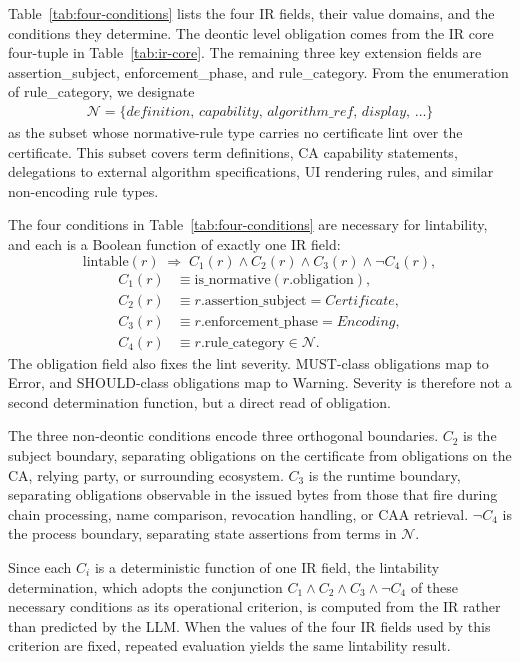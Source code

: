 Table~\ref{tab:four-conditions} lists the four IR fields, their value domains, and the conditions they determine. The deontic level obligation comes from the IR core four-tuple in Table~\ref{tab:ir-core}. The remaining three key extension fields are assertion\_\allowbreak subject, enforcement\_\allowbreak phase, and rule\_\allowbreak category. From the enumeration of rule\_\allowbreak category, we designate
\begin{gather*}
\mathcal{N} = \{definition,\,capability,\,algorithm\_ref,\,display,\,\dots\}
\end{gather*}
as the subset whose normative-rule type carries no certificate lint over the certificate. This subset covers term definitions, CA capability statements, delegations to external algorithm specifications, UI rendering rules, and similar non-encoding rule types.

The four conditions in Table~\ref{tab:four-conditions} are necessary for lintability, and each is a Boolean function of exactly one IR field:
\begin{equation}\label{eq:lintable}
\mathrm{lintable}(r) \;\Longrightarrow\; C_1(r)\wedge C_2(r)\wedge C_3(r)\wedge \neg C_4(r),
\end{equation}
\begin{align*}
C_1(r) &\equiv \mathrm{is\_normative}(r.\text{obligation}), \\
C_2(r) &\equiv r.\text{assertion\_subject} = Certificate, \\
C_3(r) &\equiv r.\text{enforcement\_phase} = Encoding, \\
C_4(r) &\equiv r.\text{rule\_category} \in \mathcal{N}.
\end{align*}
The obligation field also fixes the lint severity. MUST-class obligations map to Error, and SHOULD-class obligations map to Warning. Severity is therefore not a second determination function, but a direct read of obligation.

The three non-deontic conditions encode three orthogonal boundaries. $C_2$ is the subject boundary, separating obligations on the certificate from obligations on the CA, relying party, or surrounding ecosystem. $C_3$ is the runtime boundary, separating obligations observable in the issued bytes from those that fire during chain processing, name comparison, revocation handling, or CAA retrieval. $\neg C_4$ is the process boundary, separating state assertions from terms in $\mathcal{N}$.

Since each $C_i$ is a deterministic function of one IR field, the lintability
determination, which adopts the conjunction $C_1\wedge C_2\wedge C_3\wedge\neg C_4$ of
these necessary conditions as its operational criterion, is computed from
the IR rather than predicted by the LLM. When the values of the four IR fields
used by this criterion are fixed, repeated evaluation yields the same
lintability result.
